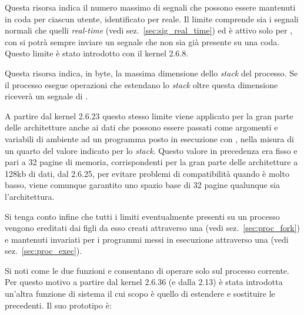 \begin{basedescript}{\desclabelwidth{2.2cm}}
\item[\constd{RLIMIT\_SIGPENDING}] Questa risorsa indica il numero massimo di
  segnali che possono essere mantenuti in coda per ciascun utente,
  identificato per  reale. Il limite comprende sia i segnali normali
  che quelli \textit{real-time} (vedi sez.~\ref{sec:sig_real_time}) ed è
  attivo solo per , con  si potrà sempre inviare un
  segnale che non sia già presente su una coda. Questo limite è stato
  introdotto con il kernel 2.6.8.

\item[\constd{RLIMIT\_STACK}] Questa risorsa indica, in byte, la massima
  dimensione dello \textit{stack} del processo. Se il processo esegue
  operazioni che estendano lo \textit{stack} oltre questa dimensione riceverà
  un segnale di .

  A partire dal kernel 2.6.23 questo stesso limite viene applicato per la gran
  parte delle architetture anche ai dati che possono essere passati come
  argomenti e variabili di ambiente ad un programma posto in esecuzione con
  , nella misura di un quarto del valore indicato per lo
  \textit{stack}.  Questo valore in precedenza era fisso e pari a 32 pagine di
  memoria, corrispondenti per la gran parte delle architetture a 128kb di
  dati, dal 2.6.25, per evitare problemi di compatibilità quando
   è molto basso, viene comunque garantito uno spazio
  base di 32 pagine qualunque sia l'architettura.

\end{basedescript}

Si tenga conto infine che tutti i limiti eventualmente presenti su un processo
vengono ereditati dai figli da esso creati attraverso una  (vedi
sez.~\ref{sec:proc_fork}) e mantenuti invariati per i programmi messi in
esecuzione attraverso una  (vedi sez.~\ref{sec:proc_exec}).

Si noti come le due funzioni  e  consentano di
operare solo sul processo corrente. Per questo motivo a partire dal kernel
2.6.36 (e dalla  2.13) è stata introdotta un'altra funzione di
sistema  il cui scopo è quello di estendere e sostituire le
precedenti.  Il suo prototipo è:

